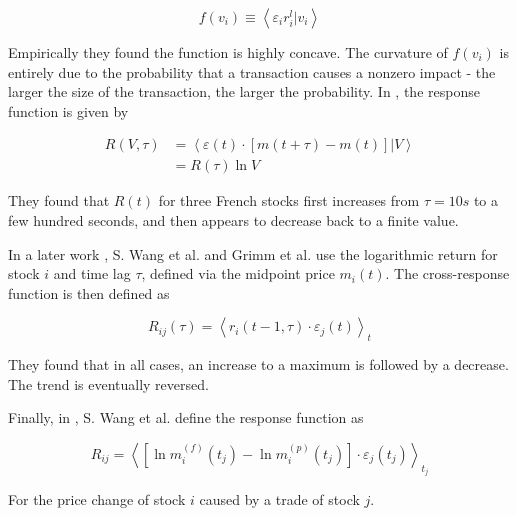 \begin{equation}\label{eq:theory_market_impact}
    f \left(v_{i}\right) \equiv \left\langle \varepsilon_{i} r^{l}_{i} |
    v_{i}\right\rangle
\end{equation}

Empirically they found  the function is highly concave. The curvature of
$f \left(v_{i}\right)$ is entirely due to the probability that a transaction
causes a nonzero impact - the larger the size of the transaction, the larger
the probability. In \cite{prop_order_book}, the response function is given by

\begin{align}\label{eq:prop_order_book}
    R \left(V, \tau\right) &= \left\langle \varepsilon \left(t\right) \cdot
    \left[m \left(t + \tau\right) - m \left(t\right)\right] |V \right\rangle \\
    &= R \left(\tau\right) \ln V
\end{align}

They found that $R \left(t\right)$ for three French stocks first increases
from $\tau = 10s$ to a few hundred seconds, and then appears to decrease back
to a finite value.

In a later work \cite{spread_changes_affect,Wang_2016_cross}, S. Wang et al.
and Grimm et al. use the logarithmic return for stock $i$ and time lag $\tau$,
defined via the midpoint price $m_{i} \left( t \right)$. The cross-response
function is then defined as

\begin{equation}\label{eq:Wang_2016}
    R_{ij}\left(\tau\right)=\left\langle r_{i}\left(t-1,\tau\right)\cdot
    \varepsilon_{j} \left(t\right) \right\rangle _{t}
\end{equation}

They found that in all cases, an increase  to a maximum is followed by a
decrease. The trend is eventually reversed.

Finally, in \cite{Wang_2018_b}, S. Wang et al. define the response function as

\begin{equation}\label{eq:Wang_2018_b}
    R_{ij} = \left\langle \left[\ln m_{i}^{\left(f\right)}\left(t_{j}\right)-
    \ln m_{i}^{\left(p\right)} \left(t_{j}\right) \right]\cdot\varepsilon_{j}
    \left(t_{j}\right)\right\rangle _{t_{j}}
\end{equation}

For the price change of stock $i$ caused by a trade of stock $j$.

